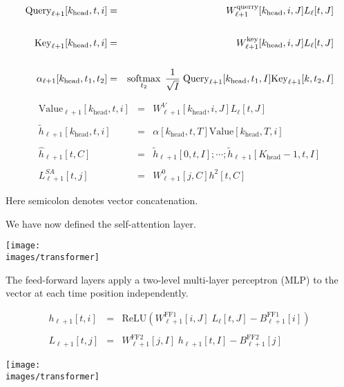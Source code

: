 {\begin{eqnarray*}
\mathrm{Query}_{\ell+1}[k_\mathrm{head},t,i] & = & W^\mathrm{querry}_{\ell+1}[k_\mathrm{head},i,J]L_\ell[t,J] \\
\\
\mathrm{Key}_{\ell+1}[k_\mathrm{head},t,i] & = &  W^\mathrm{key}_{\ell+1}[k_\mathrm{head},i,J]L_\ell[t,J] \\
\\
\alpha_{\ell+1}[k_\mathrm{head},t_1,t_2] & = & \operatorname*{softmax}_{t_2}\; \frac{1}{\sqrt{I}}\;\mathrm{Query}_{\ell+1}[k_\mathrm{head},t_1,I]\mathrm{Key}_{\ell+1}[k,t_2,I]
\end{eqnarray*}

      
\begin{eqnarray*}
\mathrm{Value}_{\ell+1}[k_\mathrm{head},t,i] & = & W^V_{\ell+1}[k_\mathrm{head},i,J]L_\ell[t,J] \\
\\
\tilde{h}_{\ell+1}[k_\mathrm{head},t,i] & = & \alpha[k_\mathrm{head},t,T]\mathrm{Value}[k_\mathrm{head},T,i] \\
\\
\hat{h}_{\ell+1}[t,C] & = & \tilde{h}_{\ell+1}[0,t,I];\cdots;\tilde{h}_{\ell+1}[K_\mathrm{head}-1,t,I] \\
\\
L^{SA}_{\ell+1}[t,j] & = & W^0_{\ell+1}[j,C]h^2[t,C]
\end{eqnarray*}

\vfill
Here semicolon denotes vector concatenation.


We have now defined the self-attention layer.
\vfill
\centerline{\texttt{[image: \\images/transformer]}}


The feed-forward layers apply a two-level multi-layer perceptron (MLP) to the vector at each time position independently.

\vfill

\begin{eqnarray*}
h_{\ell+1}[t,i] & = & \mathrm{ReLU}(W^{\mathrm{FF1}}_{\ell+1}[i,J]\;L_\ell[t,J] - B^{\mathrm{FF1}}_{\ell+1}[i]) \\
\\
L_{\ell+1}[t,j] & = & W^{\mathrm{FF2}}_{\ell+1}[j,I]\;h_{\ell+1}[t,I] - B^\mathrm{FF2}_{\ell+1}[j]
\end{eqnarray*}


\centerline{\texttt{[image: \\images/transformer]}}

}


